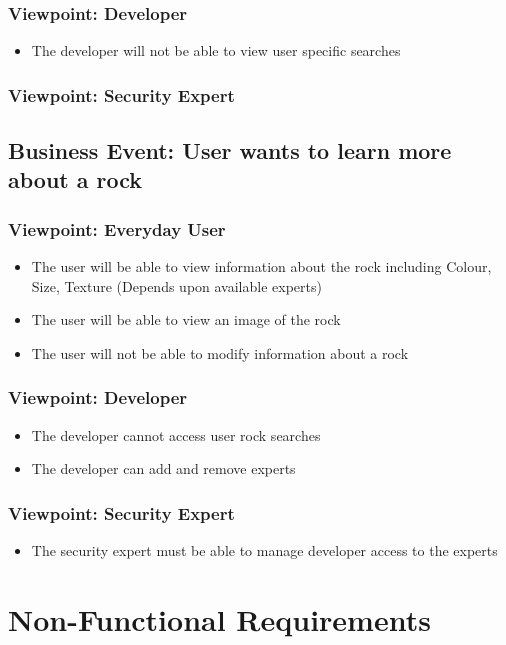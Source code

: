 \documentclass[titlepage]{article}
\begin{document}
  \subsubsection {Viewpoint: Developer}
    \begin{itemize}
      \item The developer will not be able to view user specific searches
    \end{itemize}
  \subsubsection {Viewpoint: Security Expert}
\subsection{Business Event: User wants to learn more about a rock}
  \subsubsection{Viewpoint: Everyday User}
    \begin{itemize}
      \item The user will be able to view information about the rock including Colour, Size, Texture (Depends upon available experts)
      \item The user will be able to view an image of the rock
      \item The user will not be able to modify information about a rock
    \end{itemize}
  \subsubsection{Viewpoint: Developer}
    \begin{itemize}
      \item The developer cannot access user rock searches
      \item The developer can add and remove experts
    \end{itemize}
  \subsubsection{Viewpoint: Security Expert}
    \begin{itemize}
      \item The security expert must be able to manage developer access to the experts
    \end{itemize}


\section{Non-Functional Requirements}
\end{document}
